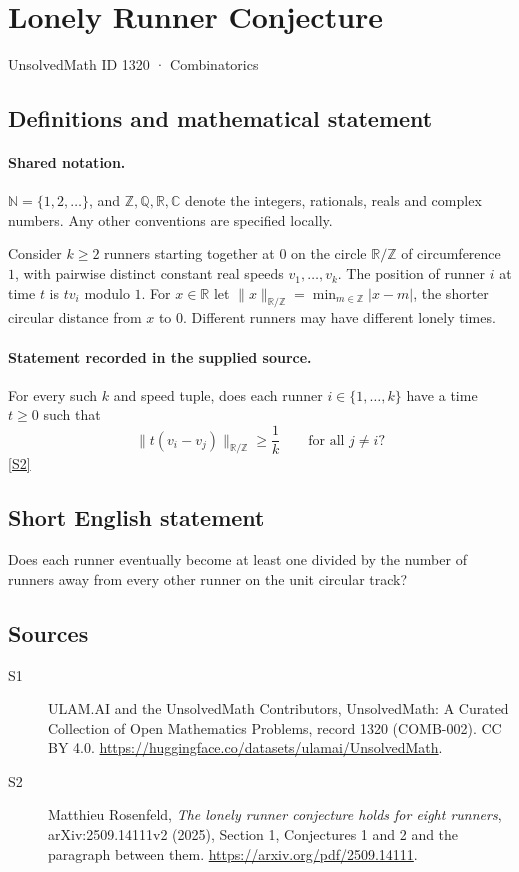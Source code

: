 \documentclass[11pt]{article}
\newcommand{\sref}[2]{\hyperlink{source:#1:#2}{[S#2]}}
\begin{document}
\setcounter{section}{1319}
\section{Lonely Runner Conjecture}\label{1320}
{\small\sffamily UnsolvedMath ID 1320 · Combinatorics}
\subsection{Definitions and mathematical statement}

\paragraph{Shared notation.}$\mathbb N=\{1,2,\ldots\}$, and $\mathbb Z,\mathbb Q,\mathbb R,\mathbb C$ denote the integers, rationals, reals and complex numbers. Any other conventions are specified locally.


Consider $k\geq2$ runners starting together at $0$ on the circle $\mathbb R/\mathbb Z$ of circumference $1$, with pairwise distinct constant real speeds $v_1,\ldots,v_k$. The position of runner $i$ at time $t$ is $tv_i$ modulo $1$. For $x\in\mathbb R$ let $\lVert x\rVert_{\mathbb R/\mathbb Z}=\min_{m\in\mathbb Z}|x-m|$, the shorter circular distance from $x$ to $0$. Different runners may have different lonely times.
\paragraph{Statement recorded in the supplied source.}
For every such $k$ and speed tuple, does each runner $i\in\{1,\ldots,k\}$ have a time $t\geq0$ such that
\[
\lVert t(v_i-v_j)\rVert_{\mathbb R/\mathbb Z}\geq\frac1k
\qquad\text{for all }j\ne i?
\] \sref{1320}{2}

\subsection{Short English statement}
Does each runner eventually become at least one divided by the number of runners away from every other runner on the unit circular track?
\subsection{Sources}
\begin{description}
\item[\hypertarget{source:1320:1}{S1}] ULAM.AI and the UnsolvedMath Contributors, UnsolvedMath: A Curated Collection of Open Mathematics Problems, record 1320 (COMB-002). CC BY 4.0. \url{https://huggingface.co/datasets/ulamai/UnsolvedMath}.
\item[\hypertarget{source:1320:2}{S2}] Matthieu Rosenfeld, \emph{The lonely runner conjecture holds for eight runners}, arXiv:2509.14111v2 (2025), Section 1, Conjectures 1 and 2 and the paragraph between them. \url{https://arxiv.org/pdf/2509.14111}.
\end{description}
\label{end:1320}
\end{document}
